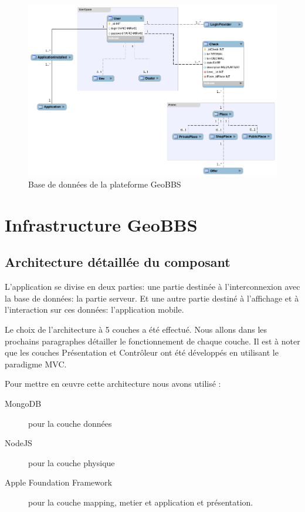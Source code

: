 \documentclass[a4paper,12pt]{report}
\begin{document}
\begin{onehalfspace}
\begin{figure}[htb]
  \centering
  \includegraphics[width=\textwidth]{diagrameBDD/model.png}
  \caption{Base de données de la plateforme GeoBBS}
  \label{fig:amqp1}
\end{figure}

\chapter{Infrastructure GeoBBS}
\section{Architecture détaillée du composant}
L'application se divise en deux parties: une partie destinée à l'interconnexion avec la base de données: la partie serveur. Et une autre partie destiné à l'affichage et à l'interaction sur ces données: l'application mobile.

Le choix de l’architecture à 5 couches a été effectué. Nous allons dans les prochains paragraphes détailler le fonctionnement de chaque couche. Il est à noter que les couches Présentation et Contrôleur ont été développés en utilisant le paradigme MVC.


Pour mettre en œuvre cette architecture nous avons utilisé :
\begin{description}
  \item[MongoDB] pour la couche données
  \item[NodeJS] pour la couche physique
  \item[Apple Foundation Framework] pour la couche mapping, metier et application et présentation.
\end{description}


\end{onehalfspace}
\end{document}
